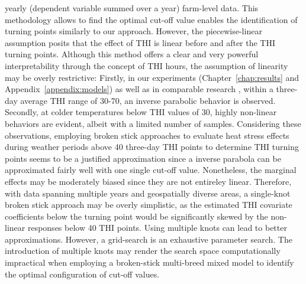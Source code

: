 yearly (dependent variable summed over a year) farm-level data. This methodology allows to find the optimal cut-off value enables the identification of turning points similarly to our approach. However, the piecewise-linear assumption posits that the effect of THI is linear before and after the THI turning points. Although this method offers a clear and very powerful interpretability through the concept of THI hours, the assumption of linearity may be overly restrictive: Firstly, in our experiments (Chapter~\ref{chap:results} and Appendix~\ref{appendix:models}) as well as in comparable research \citep{vinet_estimation_2023}, within a three-day average THI range of 30-70, an inverse parabolic behavior is observed. Secondly, at colder temperatures below THI values of 30, highly non-linear behaviors are evident, albeit with a limited number of samples. Considering these observations, employing broken stick approaches to evaluate heat stress effects during weather periods above 40 three-day THI points to determine THI turning points seems to be a justified approximation since a inverse parabola can be approximated fairly well with one single cut-off value. Nonetheless, the marginal effects may be moderately biased since they are not entireley linear. Therefore, with data spanning multiple years and geospatially diverse areas, a single-knot broken stick approach may be overly simplistic, as the estimated THI covariate coefficients below the turning point would be significantly skewed by the non-linear responses below 40 THI points. Using multiple knots can lead to better approximations. However, a grid-search is an exhaustive parameter search. The introduction of multiple knots may render the search space computationally impractical when employing a broken-stick multi-breed mixed model to identify the optimal configuration of cut-off values.

